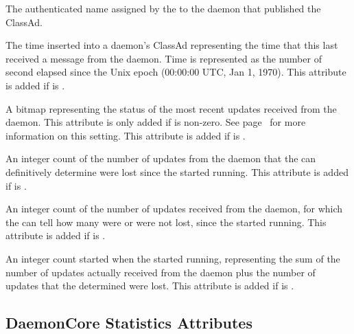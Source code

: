 \begin{description}

\item[\AdAttr{AuthenticatedIdentity}:] The authenticated name assigned
  by the  to the daemon that published the ClassAd.

\item[\AdAttr{LastHeardFrom}:] The time inserted into a daemon's
  ClassAd representing the time that this 
  last received a message from the daemon.
  Time is  represented as the number of second elapsed since
  the Unix epoch (00:00:00 UTC, Jan 1, 1970).
  This attribute is added if  is .

\item[\AdAttr{UpdatesHistory}:] A bitmap representing the status of
  the most recent updates received from the daemon. 
  This attribute is only added if 
  is non-zero. 
  See page~\pageref{param:CollectorDaemonHistorySize} for more information on
  this setting.
  This attribute is added if  is .

\item[\AdAttr{UpdatesLost}:] An integer count of the number of updates
  from the daemon that the  can definitively determine
  were lost since the  started running.
  This attribute is added if  is .

\item[\AdAttr{UpdatesSequenced}:] An integer count of the number of updates
  received from the daemon,
  for which the  can tell how many were or were not lost,
  since the  started running.
  This attribute is added if  is .

\item[\AdAttr{UpdatesTotal}:] An integer count started when the
   started running, representing the sum
  of the number of updates actually received from the daemon plus
  the number of updates that the  determined were lost.
  This attribute is added if  is .

\end{description}


\subsection*{\label{sec:DaemonCore-Statistics-Attributes}DaemonCore Statistics Attributes}


